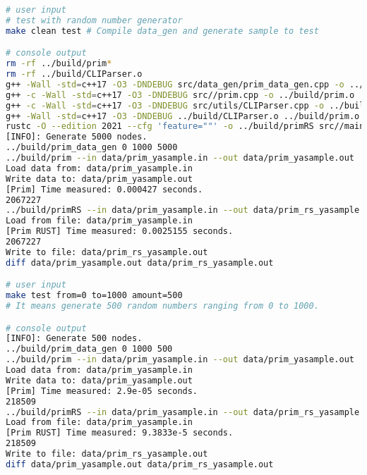 \begin{lstlisting}[language=bash]
# user input
# test with random number generator
make clean test # Compile data_gen and generate sample to test

# console output
rm -rf ../build/prim*
rm -rf ../build/CLIParser.o
g++ -Wall -std=c++17 -O3 -DNDEBUG src/data_gen/prim_data_gen.cpp -o ../build/prim_data_gen
g++ -c -Wall -std=c++17 -O3 -DNDEBUG src//prim.cpp -o ../build/prim.o
g++ -c -Wall -std=c++17 -O3 -DNDEBUG src/utils/CLIParser.cpp -o ../build/CLIParser.o
g++ -Wall -std=c++17 -O3 -DNDEBUG ../build/CLIParser.o ../build/prim.o -o ../build/prim
rustc -O --edition 2021 --cfg 'feature=""' -o ../build/primRS src//main.rs
[INFO]: Generate 5000 nodes.
../build/prim_data_gen 0 1000 5000
../build/prim --in data/prim_yasample.in --out data/prim_yasample.out
Load data from: data/prim_yasample.in
Write data to: data/prim_yasample.out
[Prim] Time measured: 0.000427 seconds.
2067227
../build/primRS --in data/prim_yasample.in --out data/prim_rs_yasample.out
Load from file: data/prim_yasample.in
[Prim RUST] Time measured: 0.0025155 seconds.
2067227
Write to file: data/prim_rs_yasample.out
diff data/prim_yasample.out data/prim_rs_yasample.out

# user input
make test from=0 to=1000 amount=500
# It means generate 500 random numbers ranging from 0 to 1000.

# console output
[INFO]: Generate 500 nodes.
../build/prim_data_gen 0 1000 500
../build/prim --in data/prim_yasample.in --out data/prim_yasample.out
Load data from: data/prim_yasample.in
Write data to: data/prim_yasample.out
[Prim] Time measured: 2.9e-05 seconds.
218509
../build/primRS --in data/prim_yasample.in --out data/prim_rs_yasample.out
Load from file: data/prim_yasample.in
[Prim RUST] Time measured: 9.3833e-5 seconds.
218509
Write to file: data/prim_rs_yasample.out
diff data/prim_yasample.out data/prim_rs_yasample.out
\end{lstlisting}

